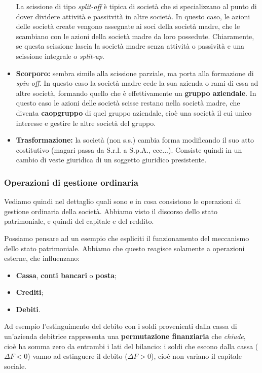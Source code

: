 \documentclass[a4paper,11pt]{article}
\begin{document}
\begin{itemize}
		La scissione di tipo \textit{split-off} è tipica di società che si specializzano al punto di dover dividere attività e passitvità in altre società.
		In questo caso, le azioni delle società create vengono assegnate ai soci della società madre, che le scambiano con le azioni della società madre da loro possedute.
		Chiaramente, se questa scissione lascia la società madre senza attività o passività e una scissione integrale o \textit{split-up}.

	\item \textbf{Scorporo:} sembra simile alla scissione parziale, ma porta alla formazione di \textit{spin-off}.
		In questo caso la società madre cede la sua azienda o rami di essa ad altre società, formando quello che è effettivamente un \textbf{gruppo aziendale}.
		In questo caso le azioni delle società scisse restano nella società madre, che diventa \textbf{caopgruppo} di quel gruppo aziendale, cioè una società il cui unico interesse e gestire le altre società del gruppo.

	\item \textbf{Trasformazione:} la società (non s.s.) cambia forma modificando il suo atto costitutivo (magari passa da S.r.l. a S.p.A., ecc...). 
		Consiste quindi in un cambio di veste giuridica di un soggetto giuridico presistente.
\end{itemize}

\subsubsection{Operazioni di gestione ordinaria}
Vediamo quindi nel dettaglio quali sono e in cosa consistono le operazioni di gestione ordinaria della società.
Abbiamo visto il discorso dello stato patrimoniale, e quindi del capitale e del reddito.

Possiamo pensare ad un esempio che espliciti il funzionamento del meccanismo dello stato patrimoniale.
Abbiamo che questo reagisce solamente a operazioni esterne, che influenzano:
\begin{itemize}
	\item \textbf{Cassa}, \textbf{conti bancari} o \textbf{posta};
	\item \textbf{Crediti};
	\item \textbf{Debiti}.
\end{itemize}

Ad esempio l'estinguimento del debito con i soldi provenienti dalla cassa di un'azienda debitrice rappresenta una \textbf{permutazione finanziaria} che \textit{chiude}, cioè ha somma zero da entrambi i lati del bilancio: i soldi che escono dalla cassa ($\Delta F < 0$) vanno ad estinguere il debito ($\Delta F > 0$), cioè non variano il capitale sociale.
\end{document}
